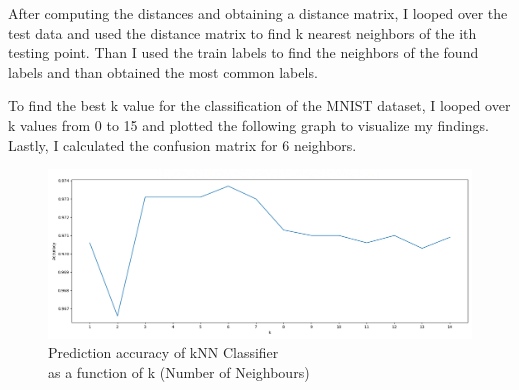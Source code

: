 After computing the distances and obtaining a distance matrix, I looped over the
test data and used the distance matrix to find k nearest neighbors of the ith
testing point. Than I used the train labels to find the neighbors of the found
labels and than obtained the most common labels.

To find the best k value for the classification of the MNIST dataset, I looped
over k values from 0 to 15 and plotted the following graph to visualize my
findings. Lastly, I calculated the confusion matrix for 6 neighbors.

\begin{figure}[H]
    \centering
    \includegraphics[width=\textwidth]{images/knn.png}
    \caption*{Prediction accuracy of kNN Classifier \\
    as a function of k (Number of Neighbours)}
    \setlength{\belowcaptionskip}{-20pt}
    \setlength{\abovecaptionskip}{-20pt}
\end{figure}


